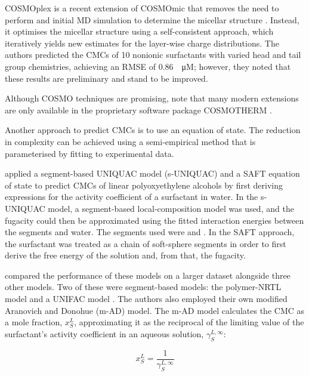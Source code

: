COSMOplex is a recent extension of COSMOmic that removes the need to perform and
initial MD simulation to determine the micellar structure
\cite{klamtCOSMOplexSelfconsistentSimulation2019}. Instead, it optimises the
micellar structure using a self-consistent approach, which iteratively yields
new estimates for the layer-wise charge distributions. The authors predicted the
CMCs of 10 nonionic surfactants with varied head and tail group chemistries,
achieving an RMSE of \SI{0.86}{\log \micro M}; however, they noted that these
results are preliminary and stand to be improved.

Although COSMO techniques are promising,
\citet{herbertDielectricContinuumMethods2021} note that many modern extensions
are only available in the proprietary software package \textsc{COSMOTHERM}
\cite{eckertFastSolventScreening2002}.

Another approach to predict CMCs is to use an equation of state. The reduction
in complexity can be achieved using a semi-empirical method that is
parameterised by fitting to experimental data.

\citet{liStudiesUNIQUACSAFT1998} applied a segment-based UNIQUAC model
(s-UNIQUAC) and a SAFT equation of state to predict CMCs of linear
polyoxyethylene alcohols by first deriving expressions for the activity
coefficient of a surfactant in water. In the s-UNIQUAC model, a segment-based
local-composition model was used, and the fugacity could then be approximated
using the fitted interaction energies between the segments and water. The
segments used were  and . In the SAFT approach, the
surfactant was treated as a chain of soft-sphere segments in order to first
derive the free energy of the solution and, from that, the fugacity.

\citet{chengCorrelationCriticalMicelle2005} compared the performance of these
models on a larger dataset alongside three other models. Two of these were
segment-based models: the polymer-NRTL model \cite{liStudiesUNIQUACSAFT1998} and
a UNIFAC model \cite{voutsasPredictionCriticalMicelle2001}. The authors also
employed their own modified Aranovich and Donohue (m-AD) model. The m-AD model
calculates the CMC as a mole fraction, $x_S^L$, approximating it as the
reciprocal of the limiting value of the surfactant's activity coefficient in an
aqueous solution, $\gamma_S^{L,\infty}$:

\begin{equation}
    \label{eq:m-AD}
    x_S^L = \frac{1}{\gamma_S^{L,\infty}}
\end{equation}

